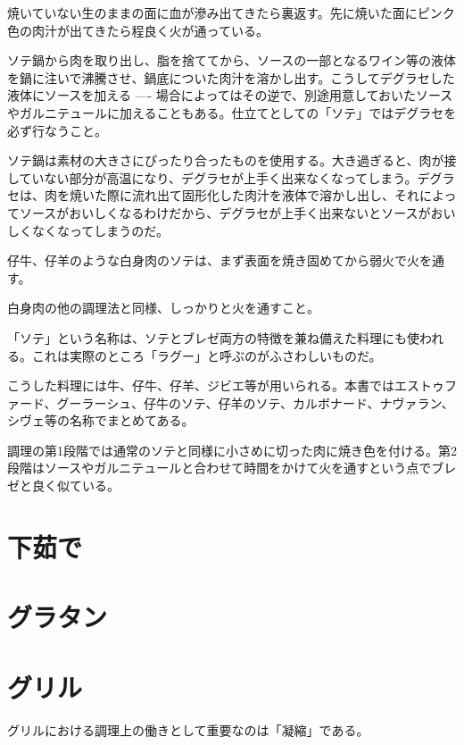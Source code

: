 焼いていない生のままの面に血が滲み出てきたら裏返す。先に焼いた面にピンク色の肉汁が出てきたら程良く火が通っている。

ソテ鍋から肉を取り出し、脂を捨ててから、ソースの一部となるワイン等の液体を鍋に注いで沸騰させ、鍋底についた肉汁を溶かし出す。こうしてデグラセした液体にソースを加える
----
場合によってはその逆で、別途用意しておいたソースやガルニテュールに加えることもある。仕立てとしての「ソテ」ではデグラセを必ず行なうこと。

ソテ鍋は素材の大きさにぴったり合ったものを使用する。大き過ぎると、肉が接していない部分が高温になり、デグラセが上手く出来なくなってしまう。デグラセは、肉を焼いた際に流れ出て固形化した肉汁を液体で溶かし出し、それによってソースがおいしくなるわけだから、デグラセが上手く出来ないとソースがおいしくなくなってしまうのだ。

仔牛、仔羊のような白身肉のソテは、まず表面を焼き固めてから弱火で火を通す。

白身肉の他の調理法と同様、しっかりと火を通すこと。

「ソテ」という名称は、ソテとブレゼ両方の特徴を兼ね備えた料理にも使われる。これは実際のところ「ラグー」と呼ぶのがふさわしいものだ。

こうした料理には牛、仔牛、仔羊、ジビエ等が用いられる。本書ではエストゥファード、グーラーシュ、仔牛のソテ、仔羊のソテ、カルボナード、ナヴァラン、シヴェ等の名称でまとめてある。

調理の第1段階では通常のソテと同様に小さめに切った肉に焼き色を付ける。第2段階はソースやガルニテュールと合わせて時間をかけて火を通すという点でブレゼと良く似ている。

\hypertarget{ux4e0bux8339ux3067}{%
\section{下茹で}\label{ux4e0bux8339ux3067}}

\hypertarget{ux30b0ux30e9ux30bfux30f3}{%
\section{グラタン}\label{ux30b0ux30e9ux30bfux30f3}}

\hypertarget{ux30b0ux30eaux30eb}{%
\section{グリル}\label{ux30b0ux30eaux30eb}}

グリルにおける調理上の働きとして重要なのは「凝縮」である。

